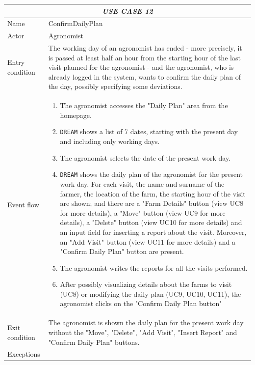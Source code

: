 \documentclass{article}
\begin{document}
\centering
\begin{longtable}{|p{3.5cm}|m{8cm}|}
 \hline
 \multicolumn{2}{|c|}{\cellcolor{white}\emph{USE CASE 12}} \\
 \endfirsthead
 \endhead
 \endfoot
 \endlastfoot
 \hline
 Name & ConfirmDailyPlan\\
 \hline
 Actor & Agronomist\\
 \hline
 Entry condition & The working day of an agronomist has ended - more precisely, it is passed at least half an hour from the starting hour of the last visit planned for the agronomist  - and the agronomist, who is already logged in the system, wants to confirm the daily plan of the day, possibly specifying some deviations.\\
 \hline
 Event flow & \begin{enumerate}
    \item The agronomist accesses the "Daily Plan" area from the homepage.
    \item \verb|DREAM| shows a list of 7 dates, starting with the present day and including only working days.
    \item The agronomist selects the date of the present work day.
    \item \verb|DREAM| shows the daily plan of the agronomist for the present work day. For each visit, the name and surname of the farmer, the location of the farm, the starting hour of the visit are shown; and there are a "Farm Details" button (view UC8 for more details), a "Move" button (view UC9 for more details), a "Delete" button (view UC10 for more details) and an input field for inserting a report about the visit. Moreover, an "Add Visit" button (view UC11 for more details) and a "Confirm Daily Plan" button are present.
    \item The agronomist writes the reports for all the visits performed.
    \item After possibly visualizing details about the farms to visit (UC8) or modifying the daily plan (UC9, UC10, UC11), the agronomist clicks on the "Confirm Daily Plan button"
 \end{enumerate}\\
 \hline
 Exit condition & The agronomist is shown the daily plan for the present work day without the "Move", "Delete", "Add Visit", "Insert Report" and "Confirm Daily Plan" buttons. \\
 \hline
 Exceptions & \begin{itemize}

\end{itemize}
\end{longtable}
\end{document}
